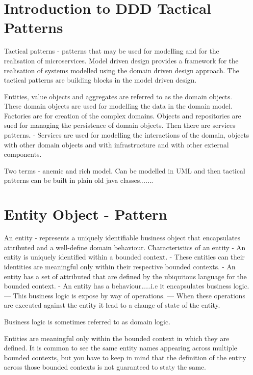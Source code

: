 \documentclass[a4paper, 11pt]{book}
\begin{document}
    \section{Introduction to DDD Tactical Patterns}
    Tactical patterns - patterns that may be used for modelling and for the realisation of microservices.
    Model driven design provides a framework for the realisation of systems modelled using the domain driven design approach.
    The tactical patterns are building blocks in the model driven design.

    Entities, value objects and aggregates are referred to as the domain objects.
    These domain objects are used for modelling the data in the domain model.
    Factories are for creation of the complex domains.
    Objects and repositories are sued for managing the persistence of domain objects.
    Then there are services patterns.
    - Services are used for modelling the interactions of the domain, objects with other domain objects and with infrastructure and with other external components. %

    Two terms - anemic and rich model.
    Can be modelled in UML and then tactical patterns can be built in plain old java classes.......


    \section{Entity Object - Pattern}

    An entity - represents a uniquely identifiable business object that encapsulates attributed and a well-define domain behaviour.
    Characteristics of an entity
    - An entity is uniquely identified within a bounded context.
    - These entities can their identities are meaningful only within their respective bounded contexts.
    - An entity has a set of attributed that are defined by the ubiquitous language for the bounded context.
    - An entity has a behaviour.....i.e it encapsulates business logic.
    --- This business logic is expose by way of operations.
    --- When these operations are executed against the entity it lead to a change of state of the entity.

    Business logic is sometimes referred to as domain logic.

    Entities are meaningful only within the bounded context in which they are defined.
    It is common to see the same entity names appearing across multiple bounded contexts, but you have to keep in mind that the definition of the entity across those bounded contexts is not guaranteed to staty the same.
\end{document}
